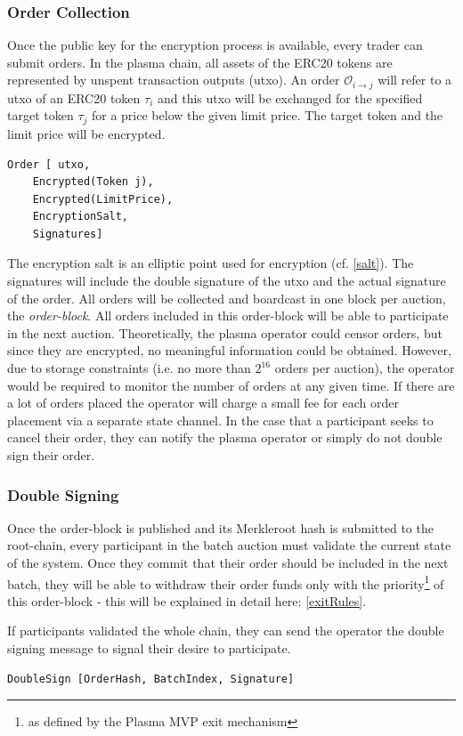 \documentclass[11pt,parskip=full]{scrartcl}%
\def\pO{\mathcal{O}}
\def\ra{\rightarrow}
\newcommand*{\erc}{ERC20 }
\begin{document}
\subsubsection{Order Collection}
\label{orderblock}
Once the public key for the encryption process is available, every trader can submit orders. 
In the plasma chain, all assets of the ERC20 tokens are represented by unspent transaction outputs (utxo). 
An order $\pO_{i\ra j}$ will refer to a utxo of an \erc token $\tau_i$ and this utxo will be exchanged for the specified target token $\tau_j$ for a price below the given limit price. The target token and the limit price will be encrypted.

\begin{verbatim}
Order [ utxo,
    Encrypted(Token j),
    Encrypted(LimitPrice),
    EncryptionSalt,
    Signatures]
\end{verbatim} 
The encryption salt is an elliptic point used for encryption (cf. \ref{salt}). The signatures will include the double signature of the utxo and the actual signature of the order.
All orders will be collected and boardcast in one block per auction, the \emph{order-block}. 
All orders included in this order-block will be able to participate in the next auction. 
Theoretically, the plasma operator could censor orders, but since they are encrypted, no meaningful information could be obtained.
However, due to storage constraints (i.e. no more than $2^{16}$ orders per auction), the operator would be required to monitor the number of orders at any given time.
If there are a lot of orders placed the operator will charge a small fee for each order placement via a separate state channel. 
In the case that a participant seeks to cancel their order, they can notify the plasma operator or simply do not double sign their order. 

\subsubsection{Double Signing}
Once the order-block is published and its Merkleroot hash is submitted to the root-chain, every participant in the batch auction must validate the current state of the system. 
Once they commit that their order should be included in the next batch, they will be able to withdraw their order funds only with the priority\footnote{as defined by the Plasma MVP exit mechanism} of this order-block - this will be explained in detail here: \ref{exitRules}.

If participants validated the whole chain, they can send the operator the double signing message to signal their desire to participate. 
\begin{verbatim}
DoubleSign [OrderHash, BatchIndex, Signature]
\end{verbatim}
\end{document}
